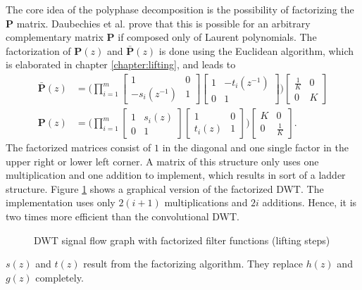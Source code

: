 \begin{refsection}
The core idea of the polyphase decomposition is the possibility of factorizing the $\bm P$ matrix.
Daubechies et al. prove that this is possible for an arbitrary complementary matrix $\bm P$ if composed only of Laurent polynomials.
The factorization of $\bm P(z)$ and $\bm{\bar P}(z)$ is done using the Euclidean algorithm, which is elaborated in chapter \ref{chapter:lifting}, and leads to
\begin{align}
	\bm{\bar P}(z) &=
	\Biggl(
	\prod_{i=1}^{m}
	\begin{bmatrix}
		1 & 0 \\
		-s_i(z^{-1}) & 1
	\end{bmatrix}
	\begin{bmatrix}
		1 & -t_i(z^{-1}) \\
		0 & 1
	\end{bmatrix}
	\Biggr)
	\begin{bmatrix}
		\frac{1}{K} & 0 \\
		0 & K
	\end{bmatrix}
	\\
	\bm P(z) &=
	\Biggl(
	\prod_{i=1}^{m}
	\begin{bmatrix}
		1 & s_i(z) \\
		0 & 1
	\end{bmatrix}
	\begin{bmatrix}
		1 & 0 \\
		t_i(z) & 1
	\end{bmatrix}
	\Biggr)
	\begin{bmatrix}
		K & 0 \\
		0 & \frac{1}{K}
	\end{bmatrix}
	.
\end{align}
The factorized matrices consist of $1$ in the diagonal and one single factor in the upper right or lower left corner.
A matrix of this structure only uses one multiplication and one addition to implement, which results in sort of a ladder structure.
Figure \ref{fpga:fig:liftingStepFactorization} shows a graphical version of the factorized DWT.
The implementation uses only $2(i+1)$ multiplications and $2i$ additions.
Hence, it is two times more efficient than the convolutional DWT.
\begin{figure}
	\centering
	
	
	\caption{DWT signal flow graph with factorized filter functions (lifting steps)}
	\label{fpga:fig:liftingStepFactorization}
\end{figure}
$s(z)$ and $t(z)$ result from the factorizing algorithm.
They replace $h(z)$ and $g(z)$ completely.


\end{refsection}
